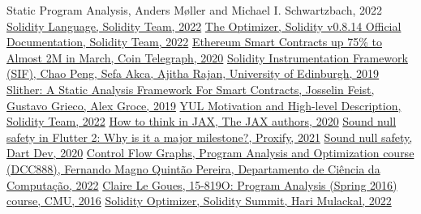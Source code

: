 
\begin{thebibliography}{9}
     {Static Program Analysis, Anders Møller and Michael I. Schwartzbach, 2022}
     \href{https://soliditylang.org/}{Solidity Language, Solidity Team, 2022}
     \href{https://docs.soliditylang.org/en/v0.8.14/internals/optimizer.html}{The Optimizer, Solidity v0.8.14 Official Documentation, Solidity Team, 2022}
     \href{https://cointelegraph.com/news/ethereum-smart-contracts-up-75-to-almost-2m-in-march}{Ethereum Smart Contracts up 75\% to Almost 2M in March, Coin Telegraph, 2020}
     \href{https://arxiv.org/pdf/1905.01659.pdf}{Solidity Instrumentation Framework (SIF), Chao Peng, Sefa Akca, Ajitha Rajan, University of Edinburgh, 2019}
     \href{https://arxiv.org/pdf/1908.09878.pdf}{Slither: A Static Analysis Framework For Smart Contracts, Josselin Feist, Gustavo Grieco, Alex Groce, 2019}
     \href{https://docs.soliditylang.org/en/v0.8.14/yul.html#motivation-and-high-level-description}{YUL Motivation and High-level Description, Solidity Team, 2022}
     \href{https://jax.readthedocs.io/en/latest/notebooks/thinking_in_jax.html#to-jit-or-not-to-jit}{How to think in JAX, The JAX authors, 2020}
     \href{https://proxify.io/articles/flutter-2-null-safety#what-is-sound-null-safety-anyways}{Sound null safety in Flutter 2: Why is it a major milestone?, Proxify, 2021}
     \href{https://dart.dev/null-safety}{Sound null safety, Dart Dev, 2020}
     \href{https://homepages.dcc.ufmg.br/~fernando/classes/dcc888/ementa/slides/ControlFlowGraphs.pdf}{Control Flow Graphs, Program Analysis and Optimization course (DCC888), Fernando Magno Quintão Pereira, Departamento de Ciência da Computação, 2022}
     \href{https://www.cs.cmu.edu/~clegoues/courses/15-819O-16sp/notes/notes04-dataflow-correctness.pdf}{Claire Le Goues, 15-819O: Program Analysis (Spring 2016) course, CMU, 2016}
     \href{https://hrkrshnn.com/t/devconnect.pdf}{Solidity Optimizer, Solidity Summit, Hari Mulackal, 2022}
\end{thebibliography}
